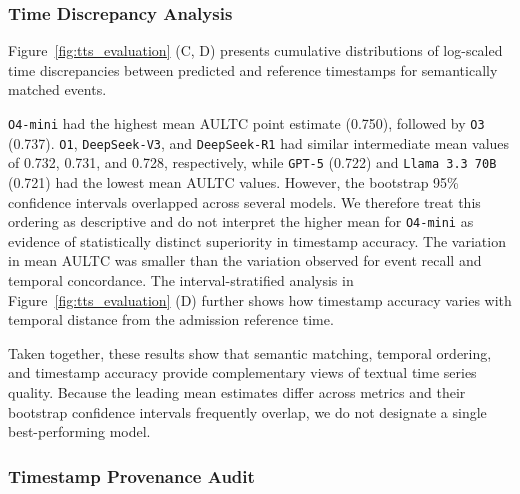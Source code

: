 \documentclass[pdflatex,sn-mathphys-num]{sn-jnl}%
\newif\ifshowrebuttalcolor
\newcommand{\rebuttal}[1]{%
  \ifshowrebuttalcolor
    \textcolor{rebuttalblue}{#1}%
  \else
    #1%
  \fi
}
\theoremstyle{thmstyleone}%
\theoremstyle{thmstyletwo}%
\theoremstyle{thmstylethree}%
\begin{document}
\subsubsection{Time Discrepancy Analysis}
\label{sec:time-descrepancy-analysis}
Figure~\ref{fig:tts_evaluation} (C, D) presents cumulative distributions of log-scaled time discrepancies between predicted and reference timestamps for semantically matched events. 
\rebuttal{
\texttt{O4-mini} had the highest mean AULTC point estimate (0.750), followed by \texttt{O3} (0.737). \texttt{O1}, \texttt{DeepSeek-V3}, and \texttt{DeepSeek-R1} had similar intermediate mean values of 0.732, 0.731, and 0.728, respectively, while \texttt{GPT-5} (0.722) and \texttt{Llama 3.3 70B} (0.721) had the lowest mean AULTC values. However, the bootstrap 95\% confidence intervals overlapped across several models. We therefore treat this ordering as descriptive and do not interpret the higher mean for \texttt{O4-mini} as evidence of statistically distinct superiority in timestamp accuracy.
The variation in mean AULTC was smaller than the variation observed for event recall and temporal concordance. The interval-stratified analysis in Figure~\ref{fig:tts_evaluation} (D) further shows how timestamp accuracy varies with temporal distance from the admission reference time.
}

Taken together, these results show that semantic matching, temporal ordering, and timestamp accuracy provide complementary views of textual time series quality. Because the leading mean estimates differ across metrics and their bootstrap confidence intervals frequently overlap, we do not designate a single best-performing model.

\subsubsection{Timestamp Provenance Audit}
\label{sec:timestamp-provenance-audit}
\end{document}
